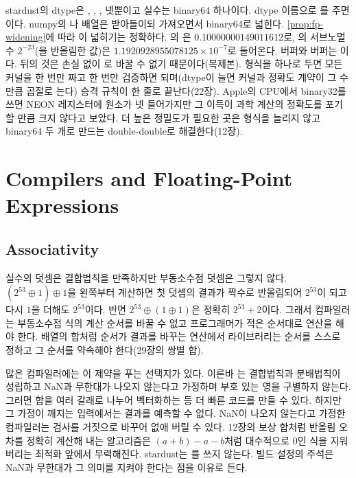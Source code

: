 stardust의 dtype은 , , ,  넷뿐이고 실수는 binary64 하나이다. dtype 이름으로 를 주면 이다. numpy의 나  배열은 받아들이되 가져오면서 binary64로 넓힌다. \cref{prop:fp-widening}에 따라 이 넓히기는 정확하다. 의 은 $0.10000000149011612$로, 의 서브노멀 수 $2^{-23}$(을 반올림한 값)은 $1.1920928955078125\times10^{-7}$로 들어온다.  버퍼와  버퍼는 이다. 뒤의 것은 손실 없이 로 바꿀 수 없기 때문이다(복제본). 형식을 하나로 두면 모든 커널을 한 번만 짜고 한 번만 검증하면 되며(dtype이 늘면 커널과 정확도 계약이 그 수만큼 곱절로 는다) 승격 규칙이 한 줄로 끝난다(22장). Apple의 CPU에서 binary32를 쓰면 NEON 레지스터에 원소가 넷 들어가지만 그 이득이 과학 계산의 정확도를 포기할 만큼 크지 않다고 보았다. 더 높은 정밀도가 필요한 곳은 형식을 늘리지 않고 binary64 두 개로 만드는 double-double로 해결한다(12장).

\section{Compilers and Floating-Point Expressions}
\label{sec:compiler-fp}

\subsection{Associativity}

실수의 덧셈은 결합법칙을 만족하지만 부동소수점 덧셈은 그렇지 않다. $(2^{53}\oplus1)\oplus1$을 왼쪽부터 계산하면 첫 덧셈의 결과가 짝수로 반올림되어 $2^{53}$이 되고 다시 $1$을 더해도 $2^{53}$이다. 반면 $2^{53}\oplus(1\oplus1)$은 정확히 $2^{53}+2$이다. 그래서 컴파일러는 부동소수점 식의 계산 순서를 바꿀 수 없고 프로그래머가 적은 순서대로 연산을 해야 한다. 배열의 합처럼 순서가 결과를 바꾸는 연산에서 라이브러리는 순서를 스스로 정하고 그 순서를 약속해야 한다(29장의 쌍별 합).

많은 컴파일러에는 이 제약을 푸는 선택지가 있다. 이른바 는 결합법칙과 분배법칙이 성립하고 NaN과 무한대가 나오지 않는다고 가정하며 부호 있는 영을 구별하지 않는다. 그러면 합을 여러 갈래로 나누어 벡터화하는 등 더 빠른 코드를 만들 수 있다. 하지만 그 가정이 깨지는 입력에서는 결과를 예측할 수 없다. NaN이 나오지 않는다고 가정한 컴파일러는  검사를 거짓으로 바꾸어 없애 버릴 수 있다. 12장의 보상 합처럼 반올림 오차를 정확히 계산해 내는 알고리즘은 $(a+b)-a-b$처럼 대수적으로 $0$인 식을 지워 버리는 최적화 앞에서 무력해진다. stardust는 를 쓰지 않는다. 빌드 설정의 주석은 NaN과 무한대가 그 의미를 지켜야 한다는 점을 이유로 든다.

